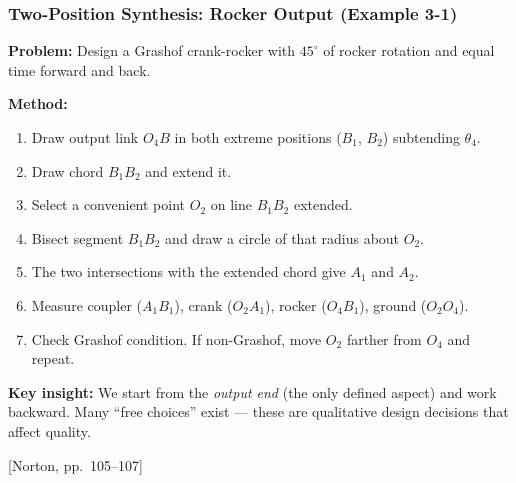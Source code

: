 \documentclass[10pt,aspectratio=43]{beamer}
\newcommand{\pref}[1]{\vfill\hfill{\scriptsize\color{gray}[Norton, pp.~#1]}}
\begin{document}
\begin{frame}
\frametitle{Two-Position Synthesis: Rocker Output (Example 3-1)}

\textbf{Problem:} Design a Grashof crank-rocker with $45^\circ$ of rocker rotation and equal time forward and back.

\vspace{4pt}
\textbf{Method:}
\begin{enumerate}
  \item Draw output link $O_4B$ in both extreme positions ($B_1$, $B_2$) subtending $\theta_4$.
  \item Draw chord $B_1B_2$ and extend it.
  \item Select a convenient point $O_2$ on line $B_1B_2$ extended.
  \item Bisect segment $B_1B_2$ and draw a circle of that radius about $O_2$.
  \item The two intersections with the extended chord give $A_1$ and $A_2$.
  \item Measure coupler ($A_1B_1$), crank ($O_2A_1$), rocker ($O_4B_1$), ground ($O_2O_4$).
  \item Check Grashof condition. If non-Grashof, move $O_2$ farther from $O_4$ and repeat.
\end{enumerate}

\vspace{4pt}
\begin{greenbox}
\textbf{Key insight:} We start from the \emph{output end} (the only defined aspect) and work backward. Many ``free choices'' exist --- these are qualitative design decisions that affect quality.
\end{greenbox}
\pref{105--107}
\end{frame}
\end{document}

